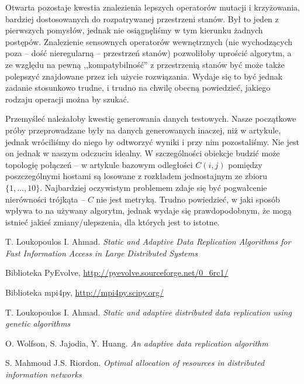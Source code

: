 \documentclass[11pt,pdftex,a4paper]{scrartcl}
\begin{document}
Otwarta pozostaje kwestia znalezienia lepszych operatorów mutacji i krzyżowania, bardziej dostosowanych
do rozpatrywanej przestrzeni stanów. Był to jeden z pierwszych pomysłów, jednak nie osiągnęliśmy w tym
kierunku żadnych postępów. Znalezienie sensownych operatorów wewnętrznych (nie wychodzących poza --
dość nieregularną -- przestrzeń stanów) pozwoliłoby uprościć algorytm, a ze względu na pewną 
,,kompatybilność'' z przestrzenią stanów być może także polepszyć znajdowane przez ich użycie 
rozwiązania. Wydaje się to być jednak zadanie stosunkowo trudne, i trudno na chwilę obecną powiedzieć,
jakiego rodzaju operacji można by szukać.

Przemyśleć należałoby kwestię generowania danych testowych. Nasze początkowe próby przeprowadzane
były na danych generowanych inaczej, niż w artykule, jednak wróciliśmy do niego by odtworzyć wyniki
i przy nim pozostaliśmy. Nie jest on jednak w naszym odczuciu idealny. W szczególności obiekcje 
budzić może topologię połączeń -- w artykule bazowym odległości \(C(i,j)\) pomiędzy poszczególnymi
hostami są losowane z rozkładem jednostajnym ze zbioru \(\{1,\ldots,10\}\). Najbardziej oczywistym
problemem zdaje się być pogwałcenie nierówności trójkąta -- \(C\) nie jest metryką. Trudno powiedzieć,
w jaki sposób wpływa to na używany algorytm, jednak wydaje się prawdopodobnym, że mogą istnieć jakieś
zmiany/ulepszenia, dla których jest to istotne. 

\begin{thebibliography}{}

  T. Loukopoulos I. Ahmad.
  \emph{Static and Adaptive Data Replication Algorithms for Fast Information Access in 
    Large Distributed Systems}

  Biblioteka PyEvolve,
  \url{http://pyevolve.sourceforge.net/0_6rc1/}

  Biblioteka mpi4py,
  \url{http://mpi4py.scipy.org/}
  
  T. Loukopoulos I. Ahmad.
  \emph{Static and adaptive distributed data replication using genetic algorithms}

  O. Wolfson, S. Jajodia, Y. Huang.
  \emph{An adaptive data replication
algorithm}

  S. Mahmoud J.S. Riordon.
  \emph{Optimal allocation of resources in
distributed information networks}



\end{thebibliography}
\end{document}
